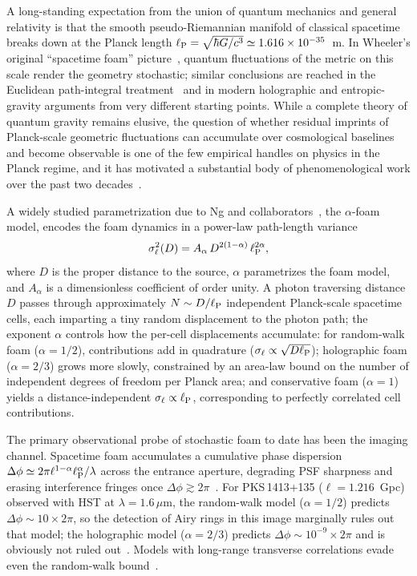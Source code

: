 \documentclass[aps,prd,onecolumn,amsmath,amssymb]{revtex4-2}
\begin{document}
A long-standing expectation from the union of quantum mechanics and general
relativity is that the smooth pseudo-Riemannian manifold of classical spacetime
breaks down at the Planck length
$\ell_{\rm P} = \sqrt{\hbar G/c^3} \simeq 1.616\times 10^{-35}$~m.
In Wheeler's original ``spacetime foam'' picture~\cite{Wheeler1955}, quantum
fluctuations of the metric on this scale render the geometry stochastic;
similar conclusions are reached in the Euclidean path-integral
treatment~\cite{Hawking1978} and in modern holographic and entropic-gravity
arguments from very different starting points.
While a complete theory of quantum gravity remains elusive, the question of
whether residual imprints of Planck-scale geometric fluctuations can accumulate
over cosmological baselines and become observable is one of the few empirical
handles on physics in the Planck regime, and it has motivated a substantial
body of phenomenological work over the past two
decades~\cite{Carlip2023,NgPerlman2022}.

A widely studied parametrization due to Ng and
collaborators~\cite{Ng2001,Ng2003,NgPerlman2022}, the $\alpha$-foam model,
encodes the foam dynamics in a power-law path-length variance
\begin{equation}
  \sigma_\ell^2(D) = A_\alpha\,D^{2(1-\alpha)}\,\ell_{\rm P}^{2\alpha},
  \label{eq:NgPerlmanVar}
\end{equation}
where $D$ is the proper distance to the source, $\alpha$ parametrizes the foam
model, and $A_\alpha$ is a dimensionless coefficient of order unity.
A photon traversing distance $D$ passes through approximately
$N \sim D/\ell_{\rm P}$ independent Planck-scale spacetime cells, each imparting
a tiny random displacement to the photon path; the exponent $\alpha$ controls
how the per-cell displacements accumulate: for random-walk foam ($\alpha=1/2$),
contributions add in quadrature ($\sigma_\ell \propto \sqrt{D\ell_{\rm P}}$);
holographic foam ($\alpha=2/3$) grows more slowly, constrained by an area-law
bound on the number of independent degrees of freedom per Planck area; and
conservative foam ($\alpha=1$) yields a distance-independent
$\sigma_\ell \propto \ell_{\rm P}$, corresponding to perfectly correlated cell
contributions.

The primary observational probe of stochastic foam to date has been the imaging
channel. Spacetime foam accumulates a cumulative phase dispersion
$\Delta\phi \simeq 2\pi\ell^{1-\alpha}\ell_{\rm P}^{\alpha}/\lambda$ across the
entrance aperture, degrading PSF sharpness and erasing interference fringes once
$\Delta\phi \gtrsim 2\pi$~\cite{LieuHillman2003}.
For PKS\,1413$+$135 ($\ell = 1.216$~Gpc) observed with HST at $\lambda=1.6\,\mu$m,
the random-walk model ($\alpha=1/2$) predicts $\Delta\phi \sim 10\times 2\pi$,
so the detection of Airy rings in this image marginally rules out that model;
the holographic model ($\alpha=2/3$) predicts $\Delta\phi \sim 10^{-9}\times 2\pi$
and is obviously not ruled out~\cite{NgPerlman2022,Christiansen2011,Perlman2015}.
Models with long-range transverse correlations evade even the random-walk
bound~\cite{LeeZurekChen2024}.
\end{document}
